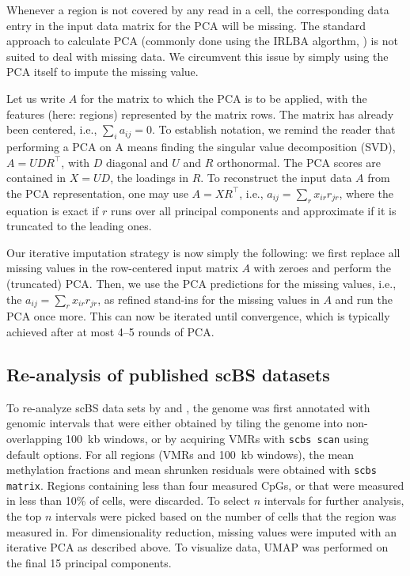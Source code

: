 \documentclass[twocolumn,10pt]{article}
\begin{document}
Whenever a region is not covered by any read in a cell, the corresponding data entry in the input data matrix for the PCA will be missing. The standard approach to calculate PCA (commonly done using the IRLBA algorthm, \citep{Baglama2005}) is not suited to deal with missing data. We circumvent this issue by simply using the PCA itself to impute the missing value.

Let us write $A$ for the matrix to which the PCA is to be applied, with the features (here: regions) represented by the matrix rows. The matrix has already been centered, i.e., $\sum_i a_{ij}=0$. To establish notation, we remind the reader that performing a PCA on A means finding the singular value decomposition (SVD), $A=UDR^\top$, with $D$ diagonal and $U$ and $R$ orthonormal. The PCA scores are contained in $X=UD$, the loadings in $R$. To reconstruct the input data $A$ from the PCA representation, one may use $A=XR^\top$, i.e., $a_{ij}=\sum_r x_{ir} r_{jr}$, where the equation is exact if $r$ runs over all principal components and approximate if it is truncated to the leading ones.

Our iterative imputation strategy is now simply the following: we first replace all missing values in the row-centered input matrix $A$ with zeroes and perform the (truncated) PCA. Then, we use the PCA predictions for the missing values, i.e., the $a_{ij}=\sum_r x_{ir} r_{jr}$, as refined stand-ins for the missing values in $A$ and run the PCA once more. This can now be iterated until convergence, which is typically achieved after at most 4--5 rounds of PCA.

\subsection{Re-analysis of published scBS datasets}
To re-analyze scBS data sets by \citet{luo2017single} and \citet{argelaguet2019gastru}, the genome was first annotated with genomic intervals that were either obtained by tiling the genome into non-overlapping 100~kb windows, or by acquiring VMRs with \texttt{scbs scan} using default options. For all regions (VMRs and 100~kb windows), the mean methylation fractions and mean shrunken residuals were obtained with \texttt{scbs matrix}. Regions containing less than four measured CpGs, or that were measured in less than 10\% of cells, were discarded. To select $n$ intervals for further analysis, the top $n$ intervals were picked based on the number of cells that the region was measured in. 
For dimensionality reduction, missing values were imputed with an iterative PCA as described above. To visualize data, UMAP was performed on the final 15 principal components.
\end{document}
